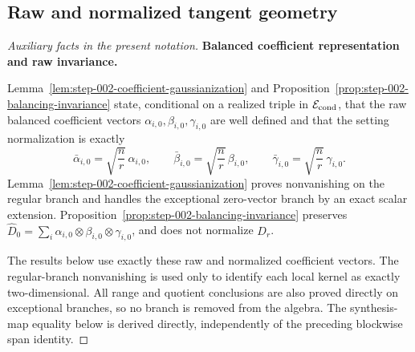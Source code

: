\subsection{Raw and normalized tangent geometry}\label{app:step-005}

\begin{proof}[Auxiliary facts in the present notation]


\medskip\noindent\textbf{Balanced coefficient representation and raw invariance.}\par

Lemma~\ref{lem:step-002-coefficient-gaussianization} and
Proposition~\ref{prop:step-002-balancing-invariance} state, conditional on a
realized triple in \(\mathcal E_{\rm cond}\), that the
raw balanced coefficient vectors
\(\alpha_{i,0},\beta_{i,0},\gamma_{i,0}\) are well defined and that the
setting normalization is exactly
\[
  \bar\alpha_{i,0}=\sqrt{\frac nr}\,\alpha_{i,0},\qquad
  \bar\beta_{i,0}=\sqrt{\frac nr}\,\beta_{i,0},\qquad
  \bar\gamma_{i,0}=\sqrt{\frac nr}\,\gamma_{i,0}.
\]
Lemma~\ref{lem:step-002-coefficient-gaussianization} proves nonvanishing on
the regular branch and handles the exceptional zero-vector branch by an exact
scalar extension. Proposition~\ref{prop:step-002-balancing-invariance}
preserves
\(\widehat D_0=\sum_i\alpha_{i,0}\otimes\beta_{i,0}\otimes\gamma_{i,0}\),
and does not normalize \(D_r\).

The results below use exactly these raw and normalized coefficient vectors.
The regular-branch nonvanishing is used only
to identify each local kernel as exactly two-dimensional. All range and
quotient conclusions are also proved directly on exceptional branches, so no
branch is removed from the algebra. The synthesis-map equality below is
derived directly, independently of the preceding blockwise span identity.

\end{proof}




